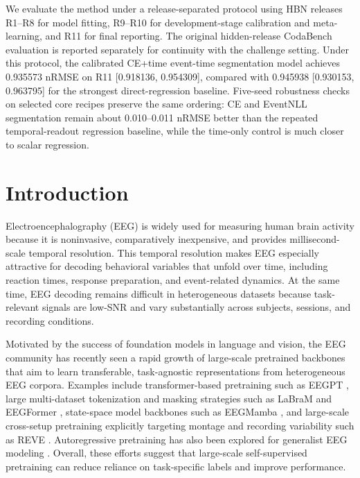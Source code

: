 \documentclass[12pt]{article}
\begin{document}
We evaluate the method under a release-separated protocol using HBN releases R1--R8 for model fitting, R9--R10 for development-stage calibration and meta-learning, and R11 for final reporting. The original hidden-release CodaBench evaluation is reported separately for continuity with the challenge setting. Under this protocol, the calibrated CE+time event-time segmentation model achieves 0.935573 nRMSE on R11 [0.918136, 0.954309], compared with 0.945938 [0.930153, 0.963795] for the strongest direct-regression baseline. Five-seed robustness checks on selected core recipes preserve the same ordering: CE and EventNLL segmentation remain about 0.010--0.011 nRMSE better than the repeated temporal-readout regression baseline, while the time-only control is much closer to scalar regression.






\section{Introduction}

Electroencephalography (EEG) is widely used for measuring human brain activity because it is noninvasive, comparatively inexpensive, and provides millisecond-scale temporal resolution. This temporal resolution makes EEG especially attractive for decoding behavioral variables that unfold over time, including reaction times, response preparation, and event-related dynamics. At the same time, EEG decoding remains difficult in heterogeneous datasets because task-relevant signals are low-SNR and vary substantially across subjects, sessions, and recording conditions.

Motivated by the success of foundation models in language and vision, the EEG community has recently seen a rapid growth of large-scale pretrained backbones that aim to learn transferable, task-agnostic representations from heterogeneous EEG corpora. Examples include transformer-based pretraining such as EEGPT \citep{wang2024eegpt}, large multi-dataset tokenization and masking strategies such as LaBraM \citep{Jiang2024LaBraM} and EEGFormer \citep{Chen2024EEGFormer}, state-space model backbones such as EEGMamba \citep{Wang2025EEGMamba}, and large-scale cross-setup pretraining explicitly targeting montage and recording variability such as REVE \citep{ElOuahidi2025REVE}. Autoregressive pretraining has also been explored for generalist EEG modeling \citep{Yue2024BrainGPT}. Overall, these efforts suggest that large-scale self-supervised pretraining can reduce reliance on task-specific labels and improve performance.
\end{document}
